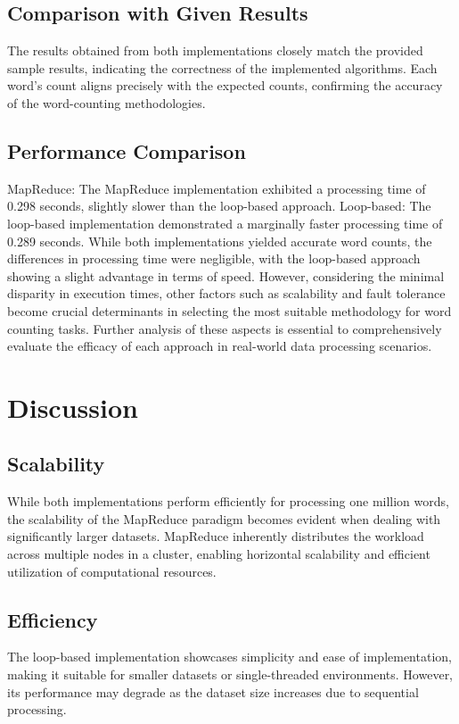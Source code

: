 \documentclass[]{acmsiggraph}
\begin{document}
\subsection{Comparison with Given Results}
The results obtained from both implementations closely match the provided sample results, indicating the correctness of the implemented algorithms. Each word's count aligns precisely with the expected counts, confirming the accuracy of the word-counting methodologies.

\subsection{Performance Comparison}
MapReduce: The MapReduce implementation exhibited a processing time of 0.298 seconds, slightly slower than the loop-based approach.
Loop-based: The loop-based implementation demonstrated a marginally faster processing time of 0.289 seconds.
While both implementations yielded accurate word counts, the differences in processing time were negligible, with the loop-based approach showing a slight advantage in terms of speed. However, considering the minimal disparity in execution times, other factors such as scalability and fault tolerance become crucial determinants in selecting the most suitable methodology for word counting tasks. Further analysis of these aspects is essential to comprehensively evaluate the efficacy of each approach in real-world data processing scenarios.

\section{Discussion}

\subsection{Scalability}
While both implementations perform efficiently for processing one million words, the scalability of the MapReduce paradigm becomes evident when dealing with significantly larger datasets. MapReduce inherently distributes the workload across multiple nodes in a cluster, enabling horizontal scalability and efficient utilization of computational resources.

\subsection{Efficiency}
The loop-based implementation showcases simplicity and ease of implementation, making it suitable for smaller datasets or single-threaded environments. However, its performance may degrade as the dataset size increases due to sequential processing.
\end{document}
